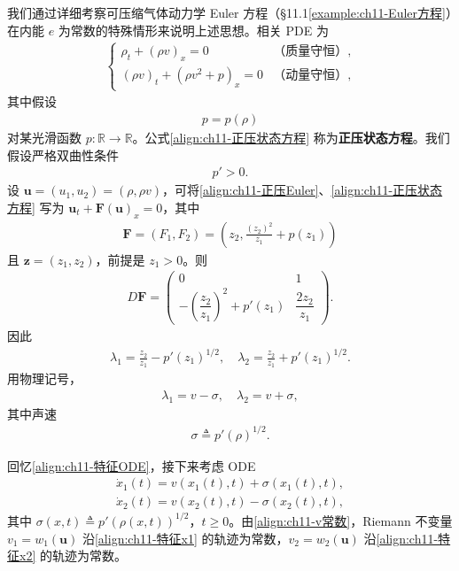 \documentclass[../../main.tex]{subfiles}
\begin{document}
\begin{example}[正压可压缩气体动力学。]\label{example:ch11-正压气体动力学}我们通过详细考察可压缩气体动力学 Euler 方程（\S11.1\cref{example:ch11-Euler方程}）在内能 $e$ 为常数的特殊情形来说明上述思想。相关 PDE 为
\begin{align}
\begin{cases}
\rho_t+(\rho v)_x=0 & \text{（质量守恒）},\\
(\rho v)_t+(\rho v^2+p)_x=0 & \text{（动量守恒）},
\end{cases}
\label{align:ch11-正压Euler}
\end{align}
其中假设
\begin{align}
p=p(\rho)
\label{align:ch11-正压状态方程}
\end{align}
对某光滑函数 $p:\mathbb{R}\to\mathbb{R}$。公式\eqref{align:ch11-正压状态方程} 称为\textbf{正压状态方程}。我们假设严格双曲性条件
\begin{align}
p'>0.
\label{align:ch11-正压双曲}
\end{align}
设 $\mathbf{u}=(u_1,u_2)=(\rho,\rho v)$，可将\eqref{align:ch11-正压Euler}、\eqref{align:ch11-正压状态方程} 写为 $\mathbf{u}_t+\mathbf{F}(\mathbf{u})_x=0$，其中
\begin{align*}
\mathbf{F}=(F_1,F_2)=\left(z_2,\frac{(z_2)^2}{z_1}+p(z_1)\right)
\end{align*}
且 $\mathbf{z}=(z_1,z_2)$，前提是 $z_1>0$。则
\begin{align*}
D\mathbf{F}=\begin{pmatrix}0 & 1\\ -\left(\dfrac{z_2}{z_1}\right)^2+p'(z_1) & \dfrac{2z_2}{z_1}\end{pmatrix}.
\end{align*}
因此
\begin{align}
\lambda_1=\frac{z_2}{z_1}-p'(z_1)^{1/2},\quad \lambda_2=\frac{z_2}{z_1}+p'(z_1)^{1/2}.
\label{align:ch11-正压特征值}
\end{align}
用物理记号，
\begin{align}
\lambda_1=v-\sigma,\quad \lambda_2=v+\sigma,
\label{align:ch11-正压物理特征值}
\end{align}
其中声速
\begin{align}
\sigma\triangleq p'(\rho)^{1/2}.
\label{align:ch11-声速}
\end{align}

回忆\eqref{align:ch11-特征ODE}，接下来考虑 ODE
\begin{align}
\dot{x}_1(t)=v(x_1(t),t)+\sigma(x_1(t),t),
\label{align:ch11-特征x1}
\end{align}
\begin{align}
\dot{x}_2(t)=v(x_2(t),t)-\sigma(x_2(t),t),
\label{align:ch11-特征x2}
\end{align}
其中 $\sigma(x,t)\triangleq p'(\rho(x,t))^{1/2}$，$t\geqslant 0$。由\eqref{align:ch11-v常数}，Riemann 不变量 $v_1=w_1(\mathbf{u})$ 沿\eqref{align:ch11-特征x1} 的轨迹为常数，$v_2=w_2(\mathbf{u})$ 沿\eqref{align:ch11-特征x2} 的轨迹为常数。


\end{example}
\end{document}

